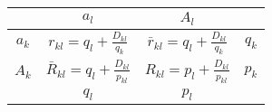 \documentclass[]{article}
\begin{document}
\begin{longtable}[]{@{}cccc@{}}
\toprule
\begin{minipage}[b]{0.22\columnwidth}\centering
\strut
\end{minipage} & \begin{minipage}[b]{0.22\columnwidth}\centering
\(a_l\)\strut
\end{minipage} & \begin{minipage}[b]{0.22\columnwidth}\centering
\(A_l\)\strut
\end{minipage} & \begin{minipage}[b]{0.22\columnwidth}\centering
\strut
\end{minipage}\tabularnewline
\midrule
\endhead
\begin{minipage}[t]{0.22\columnwidth}\centering
\(a_k\)\strut
\end{minipage} & \begin{minipage}[t]{0.22\columnwidth}\centering
\(r_{kl}=q_l+\frac{D_{kl}}{q_k}\)\strut
\end{minipage} & \begin{minipage}[t]{0.22\columnwidth}\centering
\(\bar{r}_{kl}=q_l+\frac{D_{kl}}{q_k}\)\strut
\end{minipage} & \begin{minipage}[t]{0.22\columnwidth}\centering
\(q_k\)\strut
\end{minipage}\tabularnewline
\begin{minipage}[t]{0.22\columnwidth}\centering
\(A_k\)\strut
\end{minipage} & \begin{minipage}[t]{0.22\columnwidth}\centering
\(\bar{R}_{kl}=q_l+\frac{D_{kl}}{p_{kl}}\)\strut
\end{minipage} & \begin{minipage}[t]{0.22\columnwidth}\centering
\(R_{kl}=p_l+\frac{D_{kl}}{p_{kl}}\)\strut
\end{minipage} & \begin{minipage}[t]{0.22\columnwidth}\centering
\(p_k\)\strut
\end{minipage}\tabularnewline
\begin{minipage}[t]{0.22\columnwidth}\centering
\strut
\end{minipage} & \begin{minipage}[t]{0.22\columnwidth}\centering
\(q_l\)\strut
\end{minipage} & \begin{minipage}[t]{0.22\columnwidth}\centering
\(p_l\)\strut
\end{minipage} & \begin{minipage}[t]{0.22\columnwidth}\centering
\strut
\end{minipage}\tabularnewline
\bottomrule
\end{longtable}
\end{document}
